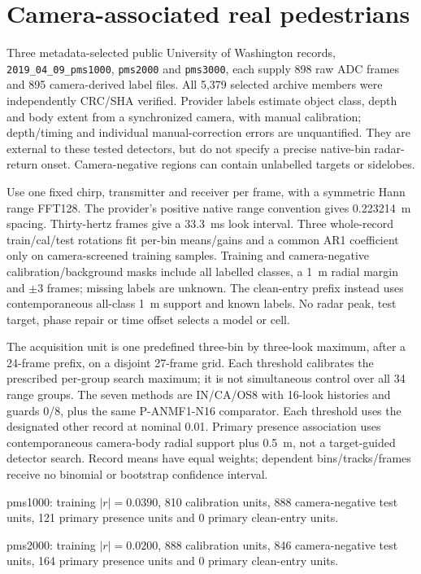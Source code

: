 \documentclass[10pt]{article}
\begin{document}
\section{Camera-associated real pedestrians}\label{sup:uw}
Three metadata-selected public University of Washington records, \texttt{2019\_04\_09\_pms1000}, \texttt{pms2000} and \texttt{pms3000}, each supply 898 raw ADC frames and 895 camera-derived label files. All 5,379 selected archive members were independently CRC/SHA verified. Provider labels estimate object class, depth and body extent from a synchronized camera, with manual calibration; depth/timing and individual manual-correction errors are unquantified. They are external to these tested detectors, but do not specify a precise native-bin radar-return onset. Camera-negative regions can contain unlabelled targets or sidelobes.

Use one fixed chirp, transmitter and receiver per frame, with a symmetric Hann range FFT128. The provider's positive native range convention gives 0.223214~m spacing. Thirty-hertz frames give a 33.3~ms look interval. Three whole-record train/cal/test rotations fit per-bin means/gains and a common AR1 coefficient only on camera-screened training samples. Training and camera-negative calibration/background masks include all labelled classes, a 1~m radial margin and $\pm3$ frames; missing labels are unknown. The clean-entry prefix instead uses contemporaneous all-class 1~m support and known labels. No radar peak, test target, phase repair or time offset selects a model or cell.

The acquisition unit is one predefined three-bin by three-look maximum, after a 24-frame prefix, on a disjoint 27-frame grid. Each threshold calibrates the prescribed per-group search maximum; it is not simultaneous control over all 34 range groups. The seven methods are IN/CA/OS8 with 16-look histories and guards 0/8, plus the same P-ANMF1-N16 comparator. Each threshold uses the designated other record at nominal 0.01. Primary presence association uses contemporaneous camera-body radial support plus 0.5~m, not a target-guided detector search. Record means have equal weights; dependent bins/tracks/frames receive no binomial or bootstrap confidence interval.

pms1000: training $|r|=0.0390$, 810 calibration units, 888 camera-negative test units, 121 primary presence units and 0 primary clean-entry units.

pms2000: training $|r|=0.0200$, 888 calibration units, 846 camera-negative test units, 164 primary presence units and 0 primary clean-entry units.
\end{document}
